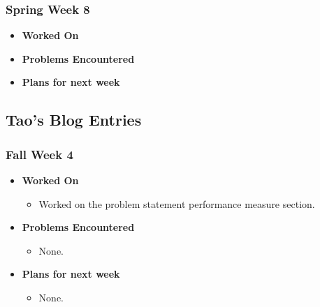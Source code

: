\documentclass{article}
\begin{document}
\subsubsection{Spring Week 8}
\begin{itemize}
    \item {\textbf{Worked On}}
    \begin{itemize}

    \end{itemize}

    \item {\textbf{Problems Encountered}}
    \begin{itemize}

    \end{itemize}

    \item{\textbf{Plans for next week}}
    \begin{itemize}

    \end{itemize}

\end{itemize}

\subsection{Tao's Blog Entries}

\subsubsection{Fall Week 4}
\begin{itemize}
    \item {\textbf{Worked On}}
    \begin{itemize}
      \item Worked on the problem statement performance measure section.
    \end{itemize}

    \item {\textbf{Problems Encountered}}
    \begin{itemize}
      \item None.
    \end{itemize}

    \item{\textbf{Plans for next week}}
    \begin{itemize}
      \item None.
    \end{itemize}

\end{itemize}
\end{document}
